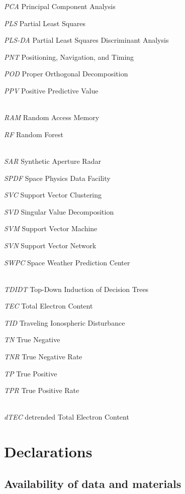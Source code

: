\documentclass[sn-mathphys-num]{sn-jnl}%
\begin{document}
\textit{PCA} Principal Component Analysis

\textit{PLS} Partial Least Squares

\textit{PLS-DA} Partial Least Squares Discriminant Analysis

\textit{PNT} Positioning, Navigation, and Timing

\textit{POD} Proper Orthogonal Decomposition

\textit{PPV} Positive Predictive Value


\\[2\baselineskip]

\textit{RAM} Random Access Memory

\textit{RF} Random Forest


\\[2\baselineskip]

\textit{SAR} Synthetic Aperture Radar

\textit{SPDF} Space Physics Data Facility

\textit{SVC} Support Vector Clustering

\textit{SVD} Singular Value Decomposition

\textit{SVM} Support Vector Machine

\textit{SVN} Support Vector Network

\textit{SWPC} Space Weather Prediction Center


\\[2\baselineskip]

\textit{TDIDT} Top-Down Induction of Decision Trees

\textit{TEC} Total Electron Content

\textit{TID} Traveling Ionospheric Disturbance

\textit{TN} True Negative

\textit{TNR} True Negative Rate

\textit{TP} True Positive

\textit{TPR} True Positive Rate


\\[2\baselineskip]

\textit{dTEC} detrended Total Electron Content



\section{Declarations}

\subsection{Availability of data and materials}
\end{document}
